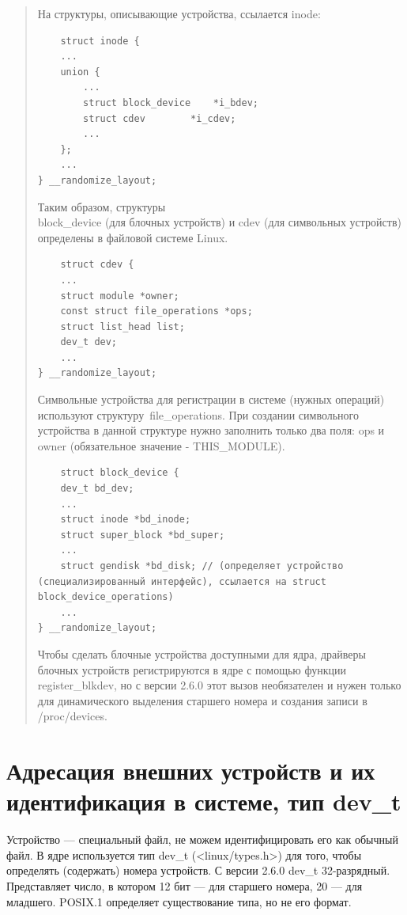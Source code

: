 \begin{quote}

На структуры, описывающие устройства, ссылается inode:

\begin{lstlisting}
	struct inode {
    ...
    union {
        ...
        struct block_device    *i_bdev;
        struct cdev        *i_cdev;
        ...
    };
    ...
} __randomize_layout;
\end{lstlisting}

Таким образом, структуры \\ block\_device (для блочных устройств) и cdev (для символьных устройств) определены в файловой системе Linux.

\begin{lstlisting}
	struct cdev {
    ...
    struct module *owner;
    const struct file_operations *ops;
    struct list_head list;
    dev_t dev;
    ...
} __randomize_layout;
\end{lstlisting}

Символьные устройства для регистрации в системе (нужных операций) используют структуру file\_operations. При создании символьного устройства в данной структуре нужно заполнить только два поля: ops и owner (обязательное значение - THIS\_MODULE).

\begin{lstlisting}
	struct block_device {
    dev_t bd_dev; 
    ...
    struct inode *bd_inode; 
    struct super_block *bd_super;
    ...
    struct gendisk *bd_disk; // (определяет устройство (специализированный интерфейс), ссылается на struct block_device_operations)
    ...
} __randomize_layout;
\end{lstlisting}

Чтобы сделать блочные устройства доступными для ядра, драйверы блочных устройств регистрируются в ядре с помощью функции register\_blkdev, но с версии 2.6.0 этот вызов необязателен и нужен только для динамического выделения старшего номера и создания записи в /proc/devices.

\end{quote}

\section{Адресация внешних устройств и их идентификация в системе, тип dev\_t}

Устройство --- специальный файл, не можем идентифицировать его как обычный файл. В ядре используется тип dev\_t (<linux/types.h>) для того, чтобы определять (содержать) номера устройств. С версии 2.6.0 dev\_t 32-разрядный. Представляет число, в котором 12 бит --- для старшего номера, 20 --- для младшего. POSIX.1 определяет существование типа, но не его формат.

